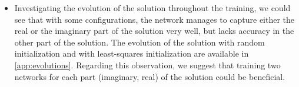 \begin{itemize}
    \item Investigating the evolution of the solution throughout the training, we could see that with some configurations, the network manages to capture either the real or the imaginary part of the solution very well, but lacks accuracy in the other part of the solution. The evolution of the solution with random initialization and with least-squares initialization are available in \autoref{app:evolutions}. Regarding this observation, we suggest that training two networks for each part (imaginary, real) of the solution could be beneficial.

\end{itemize}
